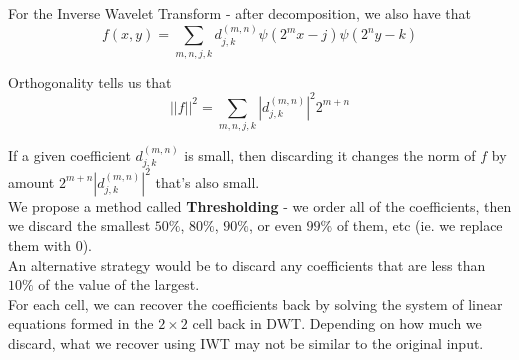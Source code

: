 \documentclass{article}
\begin{document}
For the Inverse Wavelet Transform - after decomposition, we also have that
\[f(x, y) = \sum_{m, n, j, k} d_{j,k}^{(m, n)} \psi(2^m x - j) \psi(2^n y - k)\]

Orthogonality tells us that
\[||f||^2 = \sum_{m, n, j, k} |d_{j,k}^{(m, n)}|^2 2^{m+n}\]

If a given coefficient $d_{j,k}^{(m, n)}$ is small, then discarding it changes the norm of $f$ by amount $2^{m+n} |d_{j,k}^{(m, n)}|^2$ that's also small.\\

We propose a method called \textbf{Thresholding} - we order all of the coefficients, then we discard the smallest $50\%$, $80\%$, $90\%$, or even $99\%$ of them, etc (ie. we replace them with $0$).\\

An alternative strategy would be to discard any coefficients that are less than $10\%$ of the value of the largest.\\

For each cell, we can recover the coefficients back by solving the system of linear equations formed in the $2 \times 2$ cell back in DWT. Depending on how much we discard, what we recover using IWT may not be similar to the original input.
\end{document}
